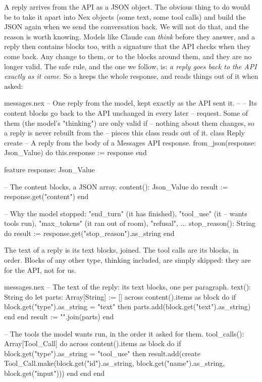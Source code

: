 A reply arrives from the API as a JSON object. The obvious thing to do
would be to take it apart into Nex objects (some text, some tool calls)
and build the JSON again when we send the conversation back. We will not
do that, and the reason is worth knowing. Models like Claude can
\emph{think} before they answer, and a reply then contains
 blocks too, with a signature that the API checks when they
come back. Any change to them, or to the blocks around them, and they are
no longer valid. The safe rule, and the one we follow, is: \emph{a reply
goes back to the API exactly as it came}. So a  keeps the whole
response, and reads things out of it when asked:

\begin{append}{messages.nex}
-- One reply from the model, kept exactly as the API sent it.
--
-- Its content blocks go back to the API unchanged in every later
-- request. Some of them (the model's "thinking") are only valid if
-- nothing about them changes, so a reply is never rebuilt from the
-- pieces this class reads out of it.
class Reply
create
  -- A reply from the body of a Messages API response.
  from_json(response: Json_Value) do
    this.response := response
  end

feature
  response: Json_Value

  -- The content blocks, a JSON array.
  content(): Json_Value do
    result := response.get("content")
  end

  -- Why the model stopped: "end_turn" (it has finished), "tool_use" (it
  -- wants tools run), "max_tokens" (it ran out of room), "refusal", ...
  stop_reason(): String do
    result := response.get("stop_reason").as_string
  end
\end{append}

The text of a reply is its text blocks, joined. The tool calls are its
 blocks, in order. Blocks of any other type, thinking
included, are simply skipped: they are for the API, not for us.

\begin{continued}{messages.nex}
  -- The text of the reply: its text blocks, one per paragraph.
  text(): String do
    let parts: Array[String] := []
    across content().items as block do
      if block.get("type").as_string = "text" then
        parts.add(block.get("text").as_string)
      end
    end
    result := "\n\n".join(parts)
  end

  -- The tools the model wants run, in the order it asked for them.
  tool_calls(): Array[Tool_Call] do
    across content().items as block do
      if block.get("type").as_string = "tool_use" then
        result.add(create Tool_Call.make(block.get("id").as_string,
          block.get("name").as_string, block.get("input")))
      end
    end
  end
\end{continued}


